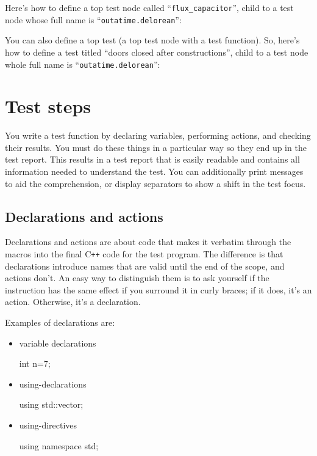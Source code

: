 \documentclass[twoside, a4paper, article]{memoir}
\providecommand\typesetexample[1]{%
}
\newcommand*\Cpp{C\texttt{++}}
\begin{document}
Here's how to define a top test node called ``\texttt{flux\_capacitor}'', child
to a test node whose full name is ``\texttt{outatime.delorean}'':

\typesetexample{top-test-node}

You can also define a top test (a top test node with a test function).  So,
here's how to define a test titled ``doors closed after constructions'', child
to a test node whole full name is ``\texttt{outatime.delorean}'':

\typesetexample{top-test}


\chapter{Test steps}
\label{cha:test-steps}

You write a test function by declaring variables, performing actions, and
checking their results.  You must do these things in a particular way so they
end up in the test report.  This results in a test report that is easily
readable and contains all information needed to understand the test.  You can
additionally print messages to aid the comprehension, or display separators to
show a shift in the test focus.

\section{Declarations and actions}
\label{sec:declarations-actions}

Declarations and actions are about code that makes it verbatim through the
macros into the final \Cpp{} code for the test program.  The difference is that
declarations introduce names that are valid until the end of the scope, and
actions don't.  An easy way to distinguish them is to ask yourself if the
instruction has the same effect if you surround it in curly braces; if it does,
it's an action. Otherwise, it's a declaration.

Examples of declarations are:
\begin{itemize}
\item variable declarations
\begin{cpplisting}
int n=7;
\end{cpplisting}

\item using-declarations
\begin{cpplisting}
using std::vector;
\end{cpplisting}

\item using-directives
\begin{cpplisting}
using namespace std;
\end{cpplisting}
\end{itemize}
\end{document}
